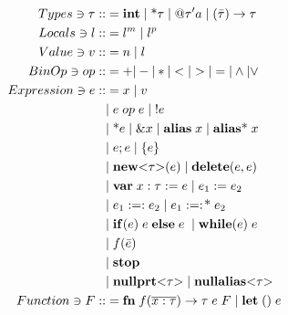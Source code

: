 \begingroup
\setlength{\jot}{-0.2ex} 
	\begin{align*}
		Types \ni \tau ::&= \mathbf{int} \;|\; \text{*}\tau \;|\; @\tau'a \;|\; (\bar\tau) \to \tau \\
		Locals \ni l ::&= l^m \;|\; l^p &&\\ 
		Value \ni v ::&= n \;|\; l && \\
		BinOp \ni op ::&= + | - | * | < | > | = | \land | \lor \\
		Expression \ni e ::&= x \;|\; v \\
		&|\; e\; op\; e \;|\; !e  \\
		&|\; \text{*}e \;|\; \&x \;|\; \mathbf{alias} \; x \;|\; \mathbf{alias}\text{*} \; x\\
		&|\; e;e \;|\; \{e\} \\ 
		&|\; \mathbf{new}\text{<}\tau\text{>}(e) \;|\; \mathbf{delete}(e, e) \; \\ 
		&|\; \mathbf{var}\; x: \tau := e \;|\; e_1 := e_2 \\
		&|\; e_1 :=: e_2 \;|\; e_1 :=:\!\text{*}\;e_2\\
		&|\; \mathbf{if}(e) \; e \; \mathbf{else} \; e \; \;|\; \mathbf{while}(e) \; e \\
		&|\; f(\bar e) \\ 
		&|\; \mathbf{stop}\\ 
		&|\; \mathbf{nullprt}\text{<}\tau\text{>} \;|\; \mathbf{nullalias}\text{<}\tau\text{>}\\ 
		Function \ni F ::&= \mathbf{fn} \; f(\overline{x : \tau}) \to \tau \; e \; F \; | \; \mathbf{let}\;() \; e \\
	\end{align*}
\endgroup

 



